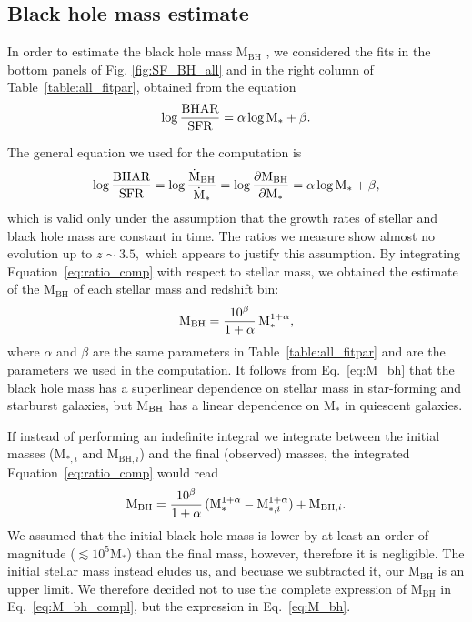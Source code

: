 \subsection{Black hole mass estimate}
In order to estimate the black hole mass M$_{\text{BH}}$ , we considered the fits in the bottom panels of Fig. \ref{fig:SF_BH_all} and in the right column of Table~\ref{table:all_fitpar}, obtained from the equation
\begin{equation}  \label{eq:ratio_fit}
\centering
\log\frac{\text{BHAR}}{\text{SFR}}=\alpha\log\text{M}_*+\beta.
\end{equation}

The general equation we used for the computation is
\begin{equation}  \label{eq:ratio_comp}
\centering
\log\frac{\text{BHAR}}{\text{SFR}}=
\log\frac{\dot{\text{M}}_{\text{BH}}}{\dot{\text{M}}_*}=
\log\frac{\partial\text{M}_{\text{BH}}}{\partial\text{M}_*}= 
\alpha \log\text{M}_* + \beta,
\end{equation}
which is valid only under the assumption that the growth rates of stellar and black hole mass are constant in time. The ratios we measure show almost no evolution up to $z\sim3.5,$  which appears to justify this assumption.
By integrating Equation~\ref{eq:ratio_comp} with respect to stellar mass, we obtained the estimate of the M$_\text{BH}$ of each stellar mass and redshift bin:
\begin{equation}  \label{eq:M_bh}
\centering
\text{M}_\text{BH}=\frac{10^\beta}{1+\alpha}\,\text{M}_*^{1+\alpha},
\end{equation}
where $\alpha$ and $\beta$ are the same parameters in Table~\ref{table:all_fitpar} and are the parameters we used in the computation. It follows from Eq.~\ref{eq:M_bh}  that the black hole mass has a superlinear dependence on stellar mass in star-forming and starburst galaxies, but M$_{\rm BH}$ has a linear dependence on M$_*$ in quiescent galaxies.

If instead of performing an indefinite integral we integrate between the initial masses ($\text{M}_{*,i}$ and $\text{M}_{\text{BH},i}$) and the final (observed) masses, the integrated Equation~\ref{eq:ratio_comp} would read
\begin{equation}  \label{eq:M_bh_compl}
\centering
\text{M}_\text{BH}=\frac{10^\beta}{1+\alpha}\,(\text{M}_*^{1+\alpha}-\text{M}_{*,i}^{1+\alpha})+\text{M}_{\text{BH},i}
.\end{equation}
We assumed that the initial black hole mass is lower by at least an order of magnitude ($\lesssim10^5\text{M}_*$) than the final mass, however, therefore it is negligible. The initial stellar mass instead eludes us, and becuase we subtracted it, our $\text{M}_\text{BH}$ is an upper limit. We therefore decided not to use the complete expression of $\text{M}_\text{BH}$ in Eq.~\ref{eq:M_bh_compl}, but the expression in Eq.~\ref{eq:M_bh}.

